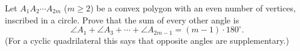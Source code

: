 Let $A_1A_2\cdots A_{2m}$ ($m\ge2$) be a convex polygon with an even number of vertices, inscribed in a circle. Prove that the sum of every other angle is
\[\angle A_1+\angle A_3+\cdots+\angle A_{2m-1}=(m-1)\cdot180^\circ.\]
(For a cyclic quadrilateral this says that opposite angles are supplementary.)
